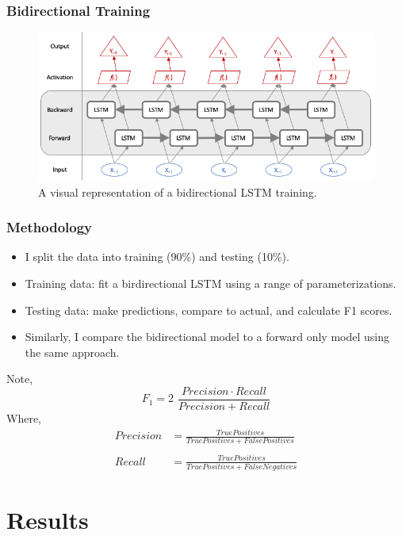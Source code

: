 \documentclass{beamer}
\begin{document}
    \begin{frame}
    	\frametitle{Bidirectional Training}
    	\begin{figure}[H]
    		\includegraphics[width=\textwidth]{figures/images/bidirectional-net.png}
    		\caption{A visual representation of a bidirectional LSTM training.}
    	\end{figure}
    \end{frame}

    \begin{frame}
    	\frametitle{Methodology}
    	\begin{itemize}
    		\item I split the data into training (90\%) and testing (10\%). 
    		\item Training data: fit a birdirectional LSTM using a range of parameterizations. 
    		\item Testing data: make predictions, compare to actual, and calculate F1 scores.
    		\item Similarly, I compare the bidirectional model to a forward only model using the same approach. 
    	\end{itemize}
        Note, 
        \begin{equation*}
        F_1 =  2 \,\, \frac{Precision \cdot Recall}{Precision + Recall}
        \end{equation*}
        Where, 
        \begin{align*}
        Precision &= \frac{True Positives}{True Positives + False Positives}\\ \\
        Recall &= \frac{True Positives}{True Positives + False Negatives}
        \end{align*}
    \end{frame}


\section{Results}
\end{document}
